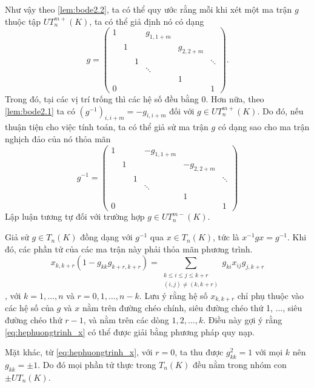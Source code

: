 Như vậy theo \cref{lem:bode2.2}, ta có thể quy ước rằng mỗi khi xét một ma trận $g$ thuộc tập $UT_n^{m+}(K)$, ta có thể giả định nó có dạng
\[
g = \begin{pmatrix} 
1 &   &   & g_{1, 1+m} &   &   \\ 
  & 1 &   &   & g_{2, 2+m} &   \\ 
  &   & 1 &   &   & \ddots \\ 
  &   &   & \ddots &   &   \\ 
  &   &   &   & 1 &   \\ 
0 &   &   &   &   & 1 
\end{pmatrix}.
\]
Trong đó, tại các vị trí trống thì các hệ số đều bằng $0$. Hơn nữa, theo \cref{lem:bode2.1} ta có $(g^{-1})_{i, i+m} = -g_{i, i+m}$ đối với $g \in UT_n^{m+}(K)$. Do đó, nếu thuận tiện cho việc tính toán, ta có thể giả sử ma trận $g$ có dạng sao cho ma trận nghịch đảo của nó thỏa mãn
\[
g^{-1} = \begin{pmatrix} 
1 &   &   & -g_{1, 1+m} &   &   \\ 
  & 1 &   &   & -g_{2, 2+m} &   \\ 
  &   & 1 &   &   & \ddots \\ 
  &   &   & \ddots &   &   \\ 
  &   &   &   & 1 &   \\ 
0 &   &   &   &   & 1 
\end{pmatrix}
\]
Lập luận tương tự đối với trường hợp $g \in UT_n^{m-}(K)$.

Giả sử $g \in T_n(K)$ đồng dạng với $g^{-1}$ qua $x \in T_n(K)$, tức là $x^{-1}gx = g^{-1}$. Khi đó, các phần tử của các ma trận này phải thỏa mãn phương trình.
\begin{equation}\label{eq:hephuongtrinh_x}
x_{k, k+r} (1 - g_{kk} g_{k+r, k+r}) = \sum_{\substack{k \le i \le j \le k+r \\ (i,j) \neq (k, k+r)}} g_{ki} x_{ij} g_{j, k+r}
\end{equation}
, với $k = 1, \dots, n$ và $r = 0, 1, \dots, n-k$. Lưu ý rằng hệ số $x_{k, k+r}$ chỉ phụ thuộc vào các hệ số của $g$ và $x$ nằm trên đường chéo chính, siêu đường chéo thứ 1, $\dots$, siêu đường chéo thứ $r-1$, và nằm trên các dòng $1,2,\dots,k$. Điều này gợi ý rằng \cref{eq:hephuongtrinh_x} có thể được giải bằng phương pháp quy nạp.

Mặt khác, từ \cref{eq:hephuongtrinh_x}, với $r = 0$, ta thu được $g_{kk}^2 = 1$ với mọi $k$ nên $g_{kk} = \pm 1$. Do đó mọi phần tử thực trong $T_n(K)$ đều nằm trong nhóm con $\pm UT_n(K)$.

